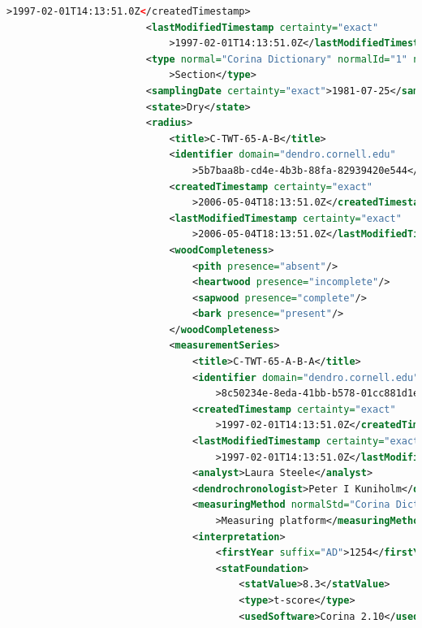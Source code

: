 \begin{lstlisting}[language=XML]
                            >1997-02-01T14:13:51.0Z</createdTimestamp>
                        <lastModifiedTimestamp certainty="exact"
                            >1997-02-01T14:13:51.0Z</lastModifiedTimestamp>
                        <type normal="Corina Dictionary" normalId="1" normalStd="Section"
                            >Section</type>
                        <samplingDate certainty="exact">1981-07-25</samplingDate>
                        <state>Dry</state>
                        <radius>
                            <title>C-TWT-65-A-B</title>
                            <identifier domain="dendro.cornell.edu"
                                >5b7baa8b-cd4e-4b3b-88fa-82939420e544</identifier>
                            <createdTimestamp certainty="exact"
                                >2006-05-04T18:13:51.0Z</createdTimestamp>
                            <lastModifiedTimestamp certainty="exact"
                                >2006-05-04T18:13:51.0Z</lastModifiedTimestamp>
                            <woodCompleteness>
                                <pith presence="absent"/>
                                <heartwood presence="incomplete"/>
                                <sapwood presence="complete"/>
                                <bark presence="present"/>
                            </woodCompleteness>
                            <measurementSeries>
                                <title>C-TWT-65-A-B-A</title>
                                <identifier domain="dendro.cornell.edu"
                                    >8c50234e-8eda-41bb-b578-01cc881d1ea1</identifier>
                                <createdTimestamp certainty="exact"
                                    >1997-02-01T14:13:51.0Z</createdTimestamp>
                                <lastModifiedTimestamp certainty="exact"
                                    >1997-02-01T14:13:51.0Z</lastModifiedTimestamp>
                                <analyst>Laura Steele</analyst>
                                <dendrochronologist>Peter I Kuniholm</dendrochronologist>
                                <measuringMethod normalStd="Corina Dictionary" normalId="1"
                                    >Measuring platform</measuringMethod>
                                <interpretation>
                                    <firstYear suffix="AD">1254</firstYear>
                                    <statFoundation>
                                        <statValue>8.3</statValue>
                                        <type>t-score</type>
                                        <usedSoftware>Corina 2.10</usedSoftware>

\end{lstlisting}
